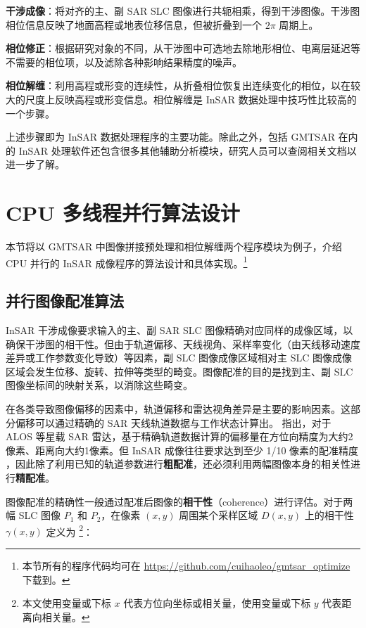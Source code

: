 \textbf{干涉成像}：将对齐的主、副 SAR SLC 图像进行共轭相乘，得到干涉图像。干涉图相位信息反映了地面高程或地表位移信息，但被折叠到一个 $2\pi$ 周期上。

\textbf{相位修正}：根据研究对象的不同，从干涉图中可选地去除地形相位、电离层延迟等不需要的相位项，以及滤除各种影响结果精度的噪声。

\textbf{相位解缠}：利用高程或形变的连续性，从折叠相位恢复出连续变化的相位，以在较大的尺度上反映高程或形变信息。相位解缠是 InSAR 数据处理中技巧性比较高的一个步骤。

上述步骤即为 InSAR 数据处理程序的主要功能。除此之外，包括 GMTSAR 在内的 InSAR 处理软件还包含很多其他辅助分析模块，研究人员可以查阅相关文档以进一步了解。


\section{CPU 多线程并行算法设计}

本节将以 GMTSAR 中图像拼接预处理和相位解缠两个程序模块为例子，介绍 CPU 并行的 InSAR 成像程序的算法设计和具体实现。\footnote{本节所有的程序代码均可在 \url{https://github.com/cuihaoleo/gmtsar_optimize} 下载到。}

\subsection{并行图像配准算法}

InSAR 干涉成像要求输入的主、副 SAR SLC 图像精确对应同样的成像区域，以确保干涉图的相干性。但由于轨道偏移、天线视角、采样率变化（由天线移动速度差异或工作参数变化导致）等因素，副 SLC 图像成像区域相对主 SLC 图像成像区域会发生位移、旋转、拉伸等类型的畸变。图像配准的目的是找到主、副 SLC 图像坐标间的映射关系，以消除这些畸变。

在各类导致图像偏移的因素中，轨道偏移和雷达视角差异是主要的影响因素。这部分偏移可以通过精确的 SAR 天线轨道数据与工作状态计算出。\citet{sandwell2011gmtsar} 指出，对于 ALOS 等星载 SAR 雷达，基于精确轨道数据计算的偏移量在方位向精度为大约2像素、距离向大约1像素。但 InSAR 成像往往要求达到至少 1/10 像素的配准精度 \cite{li2008image}，因此除了利用已知的轨道参数进行\textbf{粗配准}，还必须利用两幅图像本身的相关性进行\textbf{精配准}。\cite{sun2010jizai}

图像配准的精确性一般通过配准后图像的\textbf{相干性}（coherence）进行评估。对于两幅 SLC 图像 $P_1$ 和 $P_2$，在像素 $(x, y)$ 周围某个采样区域 $D(x, y)$ 上的相干性 $\gamma(x, y)$ 定义为 \footnote{本文使用变量或下标 $x$ 代表方位向坐标或相关量，使用变量或下标 $y$ 代表距离向相关量。}：

